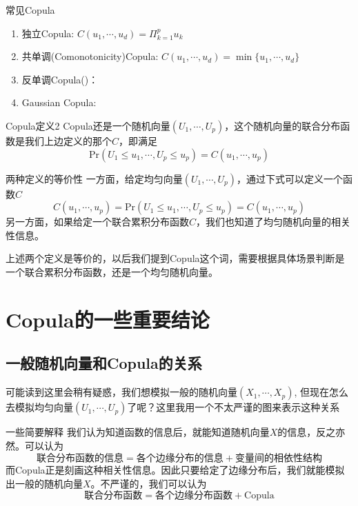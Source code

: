 \documentclass[12pt]{article}
\begin{document}
\begin{sexample}{常见Copula}{}
\begin{enumerate}
	\item 独立Copula: $C(u_1,\cdots,u_d) = \Pi_{k=1}^p u_k$
	\item 共单调(Comonotonicity)Copula: $C(u_1,\cdots,u_d) = \min\{u_1,\cdots,u_d\}$
	\item 反单调Copula()：
	\item Gaussian Copula: 
\end{enumerate}
\end{sexample}


\begin{sdefinition}{Copula定义2}{}
Copula还是一个随机向量$(U_1,\cdots,U_p)$，这个随机向量的联合分布函数是我们上边定义的那个$C$，即满足
$$
\mathrm{Pr}(U_1\leq u_1,\cdots,U_p \leq u_p) = C(u_1,\cdots,u_p)
$$
\end{sdefinition}
\begin{stheorem}{两种定义的等价性}{}
一方面，给定均匀向量$(U_1,\cdots,U_p)$，通过下式可以定义一个函数$C$
$$
C(u_1,\cdots,u_p) = \mathrm{Pr}(U_1\leq u_1,\cdots,U_p \leq u_p) = C(u_1,\cdots,u_p)
$$
另一方面，如果给定一个联合累积分布函数$C$，我们也知道了均匀随机向量的相关性信息。
\end{stheorem}
\begin{sremark}{}{}
上述两个定义是等价的，以后我们提到Copula这个词，需要根据具体场景判断是一个联合累积分布函数，还是一个均匀随机向量。
\end{sremark}

\section{Copula的一些重要结论}
\subsection{一般随机向量和Copula的关系}
可能读到这里会稍有疑惑，我们想模拟一般的随机向量$(X_1,\cdots,X_p)$, 但现在怎么去模拟均匀向量$(U_1,\cdots,U_p)$了呢？这里我用一个不太严谨的图来表示这种关系
\begin{stheorem}{一些简要解释}{}
我们认为知道函数的信息后，就能知道随机向量$X$的信息，反之亦然。可以认为
$$
\text{联合分布函数的信息} = \text{各个边缘分布的信息}
 + \text{变量间的相依性结构}
$$
而Copula正是刻画这种相关性信息。因此只要给定了边缘分布后，我们就能模拟出一般的随机向量$X$。不严谨的，我们可以认为
$$
\text{联合分布函数} = \text{各个边缘分布函数} +  \text{Copula}
$$
\end{stheorem}
\end{document}
